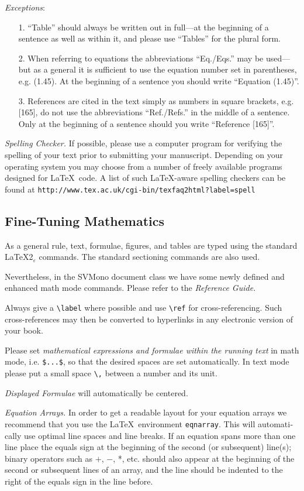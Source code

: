 \documentclass[graybox]{svmono}
\begin{document}
{\it Exceptions}:
\begin{enumerate}
\item[1.] ``Table'' should always be written out in full---at the beginning of a sentence as well as within it, and please use ``Tables'' for the plural form.
\item[2.] When referring to equations the abbreviations ``Eq./Eqs.'' may be used---but as a general it is sufficient to use the equation number set in parenthe­ses, e.g. (1.45). At the beginning of a sentence you should write ``Equation (1.45)''.
\item[3.] References are cited in the text simply as numbers in square brackets, e.g. [165], do not use the abbreviations ``Ref./Refs.'' in the middle of a sentence. Only at the beginning of a sentence should you write ``Reference [165]''.
\end{enumerate}

{\it Spelling Checker.} If possible, please use a computer program for verifying the spelling of your text prior to submitting your manuscript. Depending on your operating system you may choose from a number of freely available programs designed for \LaTeX~code. A list of such \LaTeX-aware spelling checkers can be found at {\tt http://www.tex.ac.uk/cgi-bin/texfaq2html?label=spell}

\subsection{Fine-Tuning Mathematics}
 As a general rule, text, formulae, figures, and tables are typed using the standard \LaTeX2$_\varepsilon$ commands. The standard sectioning commands are also used.

Nevertheless, in the {\sc SVMono} document class we have some newly defined and enhanced math mode commands. Please refer to the {\it Reference Guide.}

Always give a \verb|\label| where possible and use \verb|\ref| for cross-referencing. Such cross-references may then be converted to hyperlinks in any electronic version of your book.

Please set {\it mathematical expressions and formulae within the running text} in math mode, i.e. \verb|$...$|, so that the desired spaces are set automatically. In text mode please put a small space \verb|\,| between a number and its unit.

{\it Displayed Formulae} will automatically be centered.

{\it Equation Arrays.} In order to get a readable layout for your equation arrays we recommend that you use the \LaTeX~environment \verb|eqnarray|. This will automati­cally use optimal line spaces and line breaks. If an equation spans more than one line place the equals sign at the beginning of the second (or subsequent) line(s); binary operators such as $+$, $-$, *, etc. should also appear at the beginning of the second or subsequent lines of an array, and the line should be indented to the right of the equals sign in the line before.
\end{document}
